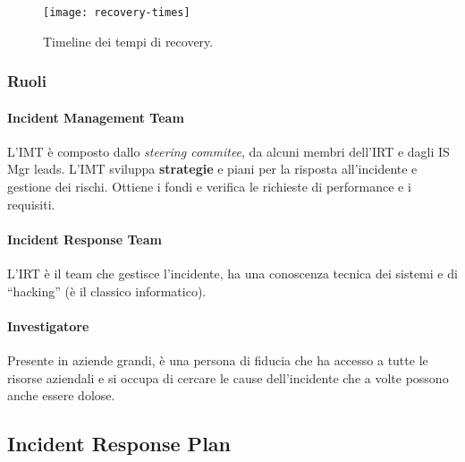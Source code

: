 \begin{figure}
        \begin{center}
                \texttt{[image: recovery-times]}
        \end{center}
        \caption{Timeline dei tempi di recovery.}
        \label{fig:recovery:timeline}
\end{figure}

\subsubsection{Ruoli}

\paragraph*{Incident Management Team} L'IMT è composto dallo 
\textit{steering commitee}, da alcuni membri dell'IRT e dagli IS Mgr
leads. L'IMT sviluppa \textbf{strategie} e
piani per la risposta all'incidente e gestione dei rischi. 
Ottiene i fondi e verifica le richieste di performance e i requisiti.

\paragraph*{Incident Response Team} L'IRT è il
team che gestisce l'incidente, ha una conoscenza tecnica dei sistemi e di
``hacking'' (è il classico informatico).

\paragraph*{Investigatore} Presente in aziende grandi, è una persona di fiducia
che ha accesso a tutte le risorse aziendali e si occupa di cercare le cause
dell'incidente che a volte possono anche essere dolose.



\subsection{Incident Response Plan}

